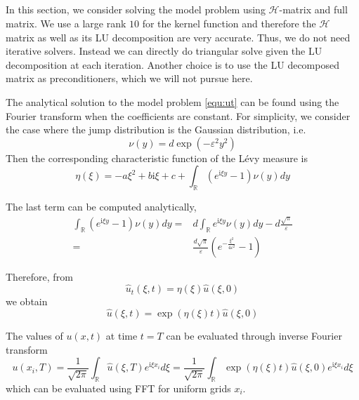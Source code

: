\documentclass[10pt,a4paper]{article}
\newcommand{\ii}[0]{\mathrm{i}}
\newcommand{\RR}[0]{\mathbb{R}}
\theoremstyle{definition}
\begin{document}
\subsection{}

In this section, we consider solving the model problem using $\mathcal{H}$-matrix and full matrix. We use a large rank $10$ for the kernel function and therefore the $\mathcal{H}$ matrix as well as its LU decomposition are very accurate. Thus, we do not need iterative solvers. Instead we can directly do triangular solve given the LU decomposition at each iteration. Another choice is to use the LU decomposed matrix as preconditioners, which we will not pursue here.  

The analytical solution to the model problem \cref{equ:ut} can be found using the Fourier transform when the coefficients are constant. For simplicity, we consider the case where the jump distribution is the Gaussian distribution, i.e. 
\begin{equation}
	\nu(y) = d\exp(-\varepsilon^2 y^2)
\end{equation}
Then the corresponding characteristic function of the L\'evy measure is 
\begin{equation}
	\eta(\xi) = -a\xi^2 + b\ii \xi + c + \int_\RR (e^{\ii \xi y}-1)\nu(y)dy
\end{equation}

The last term can be computed analytically,
\begin{align}
	\int_{\RR} {({e^{\ii\xi y}} - 1)} \nu (y)dy =& d\int_{\RR} {{e^{\ii\xi y}}\nu (y)} dy - d\frac{{\sqrt \pi  }}{\varepsilon }\\
	 =&\frac{{ d\sqrt \pi  }}{\varepsilon }\left( {{e^{ - \frac{{{\xi ^2}}}{{4{\varepsilon ^2}}}}} - 1} \right)
\end{align}

Therefore, from 
\begin{equation}
	\hat u_t(\xi, t) = \eta(\xi) \hat u(\xi, 0)
\end{equation}
we obtain
\begin{equation}
	\hat u(\xi, t) = \exp(\eta(\xi)t)\hat u(\xi, 0)
\end{equation}

The values of $u(x,t)$ at time $t=T$ can be evaluated through inverse Fourier transform
\begin{equation}
	u(x_i, T) = \frac{1}{\sqrt{2\pi}}\int_\RR \hat u(\xi, T) e^{\ii \xi x_i} d\xi  = \frac{1}{\sqrt{2\pi}}\int_\RR  \exp(\eta(\xi)t)\hat u(\xi, 0) e^{\ii \xi x_i} d\xi 
\end{equation}
which can be evaluated using FFT for uniform grids $x_i$. 
\end{document}
